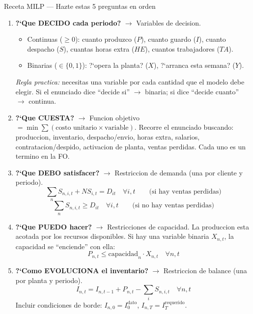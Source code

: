 \documentclass[11pt, a4paper]{article}
\begin{document}
\begin{tipprueba}{Receta MILP --- Hazte estas 5 preguntas en orden}
  \begin{enumerate}[leftmargin=1.5em, itemsep=4pt]

    \item \textbf{?`Que DECIDO cada periodo?} $\to$ Variables de decision.
      \begin{itemize}[leftmargin=1.2em, itemsep=1pt]
        \item Continuas ($\ge 0$): cuanto produzco ($P$), cuanto guardo ($I$),
              cuanto despacho ($S$), cuantas horas extra ($HE$), cuantos trabajadores ($TA$).
        \item Binarias ($\in \{0,1\}$): ?`opera la planta? ($X$), ?`arranca esta semana? ($Y$).
      \end{itemize}
      \textit{Regla practica:} necesitas una variable por cada cantidad que el modelo
      debe elegir. Si el enunciado dice ``decide si'' $\to$ binaria; si dice ``decide cuanto'' $\to$ continua.

    \item \textbf{?`Que CUESTA?} $\to$ Funcion objetivo $= \min \sum (\text{costo unitario} \times \text{variable})$.
      Recorre el enunciado buscando: produccion, inventario, despacho/envio, horas extra,
      salarios, contratacion/despido, activacion de planta, ventas perdidas.
      Cada uno es un termino en la FO.

    \item \textbf{?`Que DEBO satisfacer?} $\to$ Restriccion de demanda (una por cliente y periodo).
      \[
        \sum_n S_{n,i,t} + NS_{i,t} = D_{it} \quad \forall i,t
        \qquad \text{(si hay ventas perdidas)}
      \]
      \[
        \sum_n S_{n,i,t} \ge D_{it} \quad \forall i,t
        \qquad \text{(si no hay ventas perdidas)}
      \]

    \item \textbf{?`Que PUEDO hacer?} $\to$ Restricciones de capacidad.
      La produccion esta acotada por los recursos disponibles.
      Si hay una variable binaria $X_{n,t}$, la capacidad se ``enciende'' con ella:
      \[
        P_{n,t} \le \text{capacidad}_n \cdot X_{n,t} \quad \forall n,t
      \]

    \item \textbf{?`Como EVOLUCIONA el inventario?} $\to$ Restriccion de balance (una por planta y periodo).
      \[
        I_{n,t} = I_{n,t-1} + P_{n,t} - \sum_i S_{n,i,t} \quad \forall n,t
      \]
      Incluir condiciones de borde: $I_{n,0} = I_0^{\text{dato}}$, $I_{n,T} = I_T^{\text{requerido}}$.


\end{enumerate}
\end{tipprueba}
\end{document}
